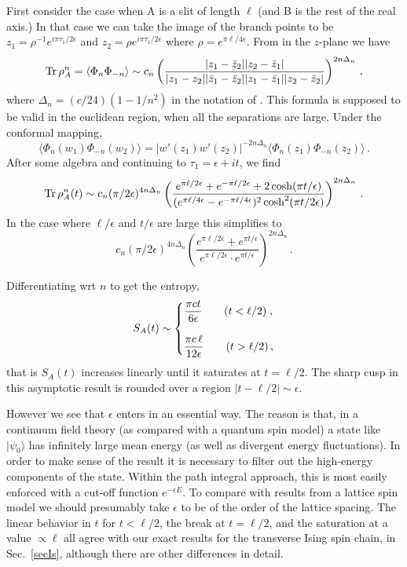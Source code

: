 \documentclass[12pt,preprint,tighten,eqsecnum,aps,floats,psfig,epsfig,amsmath,onecolumn]{revtex4-1}
\def\be{\begin{equation}}
\def\ee{\end{equation}}
\def\e{\epsilon}
\begin{document}
First consider the case when A is a slit of length $\ell$ (and B
is the rest of the real axis.) In that case we can take the image
of the branch points to be $z_1=\rho^{-1}e^{i\pi\tau_1/2\e}$
and $z_2=\rho e^{i\pi\tau_1/2\e}$ where
$\rho=e^{\pi\ell/4\e}$. From \cite{cc-04} in the $z$-plane we
have
\begin{equation}\label{zzzz}
{\rm Tr}\,\rho_A^n=\langle\Phi_n\Phi_{-n}\rangle\sim
c_n\left(\frac{|z_1-\bar z_2||z_2-\bar z_1|}{|z_1-z_2||\bar
z_1-\bar z_2||z_1-\bar z_1||z_2-\bar z_2|}\right)^{2n\Delta_n}\,,
\end{equation}
where $\Delta_n=(c/24)(1-1/n^2)$ in the notation of \cite{cc-04}.
This formula is supposed to be valid in the euclidean region, when
all the separations are large. Under the conformal mapping,
\begin{equation}
\langle\Phi_n(w_1)\Phi_{-n}(w_2)\rangle=
|w'(z_1)w'(z_2)|^{-2n\Delta_n}\langle\Phi_n(z_1)\Phi_{-n}(z_2)\rangle\,.
\end{equation}
After some algebra and continuing to $\tau_1=\e+it$, we find
\begin{equation}
{\rm Tr}\,\rho_A^n(t)\sim c_n(\pi/2\e)^{4n\Delta_n}
\left(\frac{e^{\pi\ell/2\e}+e^{-\pi\ell/2\e}+2\cosh(\pi t/\e)}
{(e^{\pi\ell/4\e}-e^{-\pi\ell/4\e})^2 \cosh^2(\pi
t/2\e)}\right)^{2n\Delta_n}\,.
\end{equation}
In the case where $\ell/\epsilon$ and $t/\epsilon$ are large this
simplifies to
\begin{equation}
c_n(\pi/2\e)^{4n\Delta_n}\left(\frac{e^{\pi\ell/2\e} +e^{\pi
t/\e}} {e^{\pi\ell/2\e}\cdot e^{\pi t/\e}}\right)^{2n\Delta_n}\,.
\end{equation}

Differentiating wrt $n$ to get the entropy,
\be
S_A(t)\sim \left\{
\begin{matrix} 
\displaystyle      \frac{\pi ct}{6\e}    \qquad(t<\ell/2)\;,\cr\cr
\displaystyle      \frac{\pi c\,\ell}{12\e}\qquad(t>\ell/2)\,,
\end{matrix}\right.
\label{SAt2}  
\ee
that is $S_A(t)$ increases linearly until it saturates at
$t=\ell/2$. The sharp cusp in this asymptotic result is rounded
over a region $|t-\ell/2|\sim\e$.

However we see that $\e$ enters in an essential way. The reason is
that, in a continuum field theory (as compared with a quantum spin
model) a state like $|\psi_0\rangle$ has infinitely large mean
energy (as well as divergent energy fluctuations). In order to
make sense of the result it is necessary to filter out the
high-energy components of the state. Within the path integral
approach, this is most easily enforced with a cut-off function
$e^{-\e E}$. To compare with results from a lattice spin model we
should presumably take $\e$ to be of the order of the lattice
spacing. The linear behavior in $t$ for $t<\ell/2$, the break at
$t=\ell/2$, and the saturation at a value $\propto\ell$ all agree
with our exact results for the transverse Ising spin chain, in
Sec.~\ref{secIs}, although there are other differences in detail.
\end{document}
